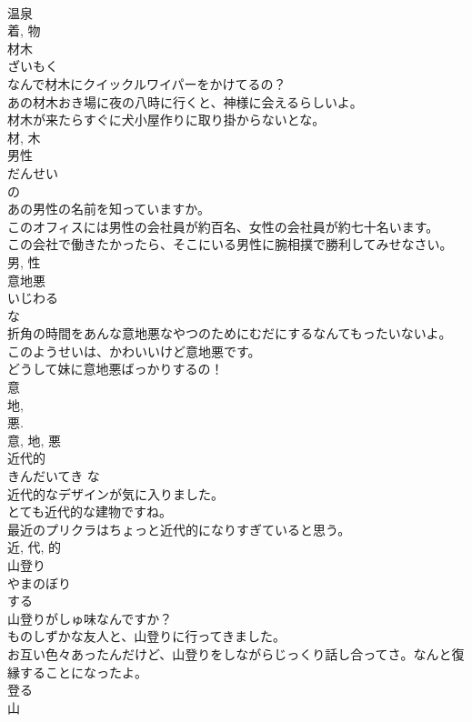 \documentclass[8pt]{extreport}
\begin{document}
\begin{CJK}{UTF8}{min}
\\	温泉 
\\	着, 物	
\\	材木	
\\	ざいもく	
\\	なんで材木にクイックルワイパーをかけてるの？	
\\	あの材木おき場に夜の八時に行くと、神様に会えるらしいよ。	
\\	材木が来たらすぐに犬小屋作りに取り掛からないとな。	
\\	材, 木	
\\	男性	
\\	だんせい	
\\	の 
\\	あの男性の名前を知っていますか。	
\\	このオフィスには男性の会社員が約百名、女性の会社員が約七十名います。	
\\	この会社で働きたかったら、そこにいる男性に腕相撲で勝利してみせなさい。	
\\	男, 性	
\\	意地悪	
\\	いじわる	
\\	な 
\\	折角の時間をあんな意地悪なやつのためにむだにするなんてもったいないよ。	
\\	このようせいは、かわいいけど意地悪です。	
\\	どうして妹に意地悪ばっかりするの！	
\\	意 
\\	地, 
\\	悪. 
\\	意, 地, 悪	
\\	近代的	
\\	きんだいてき	な 
\\	近代的なデザインが気に入りました。	
\\	とても近代的な建物ですね。	
\\	最近のプリクラはちょっと近代的になりすぎていると思う。	
\\	近, 代, 的	
\\	山登り	
\\	やまのぼり	
\\	する 
\\	山登りがしゅ味なんですか？	
\\	ものしずかな友人と、山登りに行ってきました。	
\\	お互い色々あったんだけど、山登りをしながらじっくり話し合ってさ。なんと復縁することになったよ。	
\\	登る 
\\	山 

\end{CJK}
\end{document}
